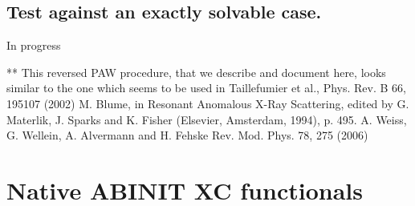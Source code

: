 \documentclass[a4paper,11pt]{report}
\begin{document}
\section{Test against an exactly solvable case.}
 
In progress

  
\begin{thebibliography}{0}
** This reversed PAW procedure, that we describe and document here, looks similar to the one which seems to be  used in Taillefumier et al., Phys. Rev. B 66, 195107 (2002) 
   M. Blume, in Resonant Anomalous X-Ray Scattering, edited by G. Materlik, J. Sparks and K. Fisher (Elsevier, Amsterdam, 1994), p. 495.
 A. Weiss, G. Wellein, A. Alvermann and H. Fehske Rev. Mod. Phys. 78, 275 (2006) 


\end{thebibliography}

\chapter*{Native ABINIT XC functionals}
\end{document}
